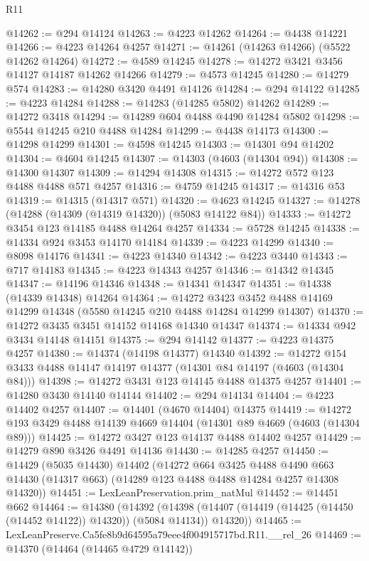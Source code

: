 \begin{lexlean}{R11}
\begin{coremodule}
@14262 := @294 @14124
@14263 := @4223 @14262
@14264 := @4438 @14221
@14266 := @4223 @14264 @4257
@14271 := @14261 (@14263 @14266) (@5522 @14262 @14264)
@14272 := @4589 @14245
@14278 := @14272 @3421 @3456 @14127 @14187 @14262 @14266
@14279 := @4573 @14245
@14280 := @14279 @574
@14283 := @14280 @3420 @4491 @14126
@14284 := @294 @14122
@14285 := @4223 @14284
@14288 := @14283 (@14285 @5802) @14262
@14289 := @14272 @3418
@14294 := @14289 @604 @4488 @4490 @14284 @5802
@14298 := @5544 @14245 @210 @4488 @14284
@14299 := @4438 @14173
@14300 := @14298 @14299
@14301 := @4598 @14245
@14303 := @14301 @94 @14202
@14304 := @4604 @14245
@14307 := @14303 (@4603 (@14304 @94))
@14308 := @14300 @14307
@14309 := @14294 @14308
@14315 := @14272 @572 @123 @4488 @4488 @571 @4257
@14316 := @4759 @14245
@14317 := @14316 @53
@14319 := @14315 (@14317 @571)
@14320 := @4623 @14245
@14327 := @14278 (@14288 (@14309 (@14319 @14320)) (@5083 @14122 @84))
@14333 := @14272 @3454 @123 @14185 @4488 @14264 @4257
@14334 := @5728 @14245
@14338 := @14334 @924 @3453 @14170 @14184
@14339 := @4223 @14299
@14340 := @8098 @14176
@14341 := @4223 @14340
@14342 := @4223 @3440
@14343 := @717 @14183
@14345 := @4223 @14343 @4257
@14346 := @14342 @14345
@14347 := @14196 @14346
@14348 := @14341 @14347
@14351 := @14338 (@14339 @14348) @14264
@14364 := @14272
    @3423
    @3452
    @4488
    @14169
    @14299
    @14348
    (@5580 @14245 @210 @4488 @14284 @14299 @14307)
@14370 := @14272 @3435 @3451 @14152 @14168 @14340 @14347
@14374 := @14334 @942 @3434 @14148 @14151
@14375 := @294 @14142
@14377 := @4223 @14375 @4257
@14380 := @14374 (@14198 @14377) @14340
@14392 := @14272 @154 @3433 @4488 @14147 @14197 @14377 (@14301 @84 @14197 (@4603 (@14304 @84)))
@14398 := @14272 @3431 @123 @14145 @4488 @14375 @4257
@14401 := @14280 @3430 @14140 @14144
@14402 := @294 @14134
@14404 := @4223 @14402 @4257
@14407 := @14401 (@4670 @14404) @14375
@14419 := @14272 @193 @3429 @4488 @14139 @4669 @14404 (@14301 @89 @4669 (@4603 (@14304 @89)))
@14425 := @14272 @3427 @123 @14137 @4488 @14402 @4257
@14429 := @14279 @890 @3426 @4491 @14136
@14430 := @14285 @4257
@14450 := @14429
    (@5035 @14430)
    @14402
    (@14272
      @664
      @3425
      @4488
      @4490
      @663
      @14430
      (@14317 @663)
      (@14289 @123 @4488 @4488 @14284 @4257 @14308 @14320))
@14451 := LexLeanPreservation.prim_natMul
@14452 := @14451 @662
@14464 := @14380
    (@14392
      (@14398 (@14407 (@14419 (@14425 (@14450 (@14452 @14122)) @14320)) (@5084 @14134)) @14320))
@14465 := LexLeanPreserve.Ca5fe8b9d64595a79eee4f004915717bd.R11.__rel_26
@14469 := @14370 (@14464 (@14465 @4729 @14142))

\end{coremodule}
\end{lexlean}
